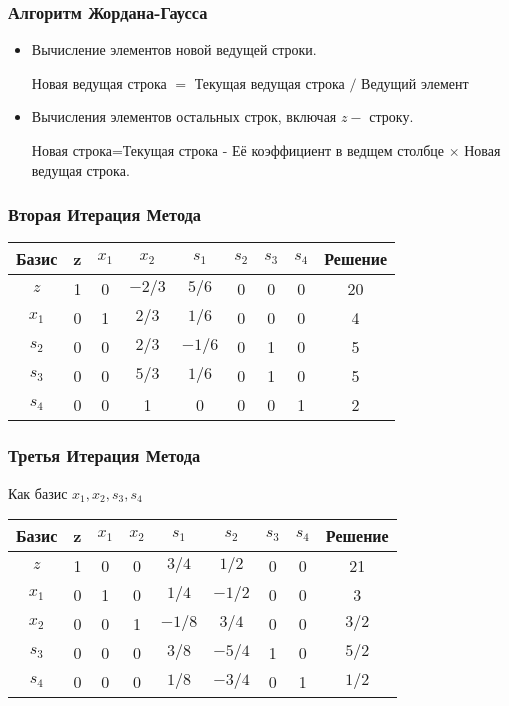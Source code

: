 \documentclass[12pt]{beamer}
\begin{document}
	\begin{frame}
		\frametitle{Алгоритм Жордана-Гаусса}
		\begin{itemize}
			\item Вычисление элементов новой ведущей строки.
			
			Новая ведущая строка $=$ Текущая ведущая строка $/$ Ведущий элемент
			\item Вычисления элементов остальных строк, включая $z-$ строку.
			
			Новая строка=Текущая строка - Её коэффициент в ведщем столбце $\times$ Новая ведущая строка.
		\end{itemize}
	\end{frame}
	\begin{frame}
		\frametitle{Вторая Итерация Метода}
		\begin{tabular}{|c|c|c|c|c|c|c|c|c|}
			\hline
			Базис & z  & $x_1$ & $x_2$  & $s_1$  & $s_2$  & $s_3$  & $s_4$  & Решение \\
			\hline
			$z $& 1  &  0 & ${-2}/{3}$ & ${5}/{6}$ & 0  & 0  & 0 & 20 \\
			\hline
			$x_1$& 0 & 1 & ${2}/{3}$  & ${1}/{6}$  & 0 & 0 & 0 & 4 \\
			
			$s_2$& 0 & 0 & ${2}/{3}$ & ${-1}/{6}$ & 0 & 1 & 0 & 5 \\
			
			$s_3$& 0 & 0 & ${5}/{3}$ & ${1}/{6}$ & 0 & 1 & 0 & 5 \\
			
			$s_4$& 0 & 0 & 1 & 0 & 0 & 0 & 1 & 2 \\ 
			\hline
		\end{tabular}
	\end{frame}
	\begin{frame}
		\frametitle{Третья Итерация Метода}
		Как базис $ x_1,x_2,s_3,s_4$
		
		
		
		\begin{tabular}{|c|c|c|c|c|c|c|c|c|}
			\hline
			Базис & z  & $x_1$ & $x_2$  & $s_1$  & $s_2$  & $s_3$  & $s_4$  & Решение \\
			\hline
			$z $& 1  &  0 & 0 & $3/4$ & $1/2$  & 0  & 0 & 21 \\
			\hline
			$x_1$& 0 & 1 & 0  & $1/4$  & $-1/2$ & 0 & 0 & 3 \\
			
			$x_2$& 0 & 0 & 1 & $-1/8$ & $3/4$ & 0 & 0 & $3/2$ \\
			
			$s_3$& 0 & 0 & 0 & $3/8$ & $-5/4$ & 1 & 0 & $5/2$ \\
			
			$s_4$& 0 & 0 & 0 & $1/8$ & $-3/4$ & 0 & 1 & $1/2$ \\ 
			\hline
		\end{tabular}
	\end{frame}
\end{document}
